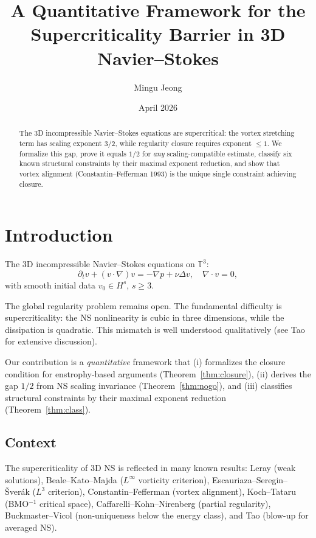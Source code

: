 \documentclass[12pt]{article}
\title{A Quantitative Framework for the\\
Supercriticality Barrier in 3D Navier--Stokes}
\author{Mingu Jeong}
\date{April 2026}
\begin{document}
\maketitle

\begin{abstract}
The 3D incompressible Navier--Stokes equations are
supercritical: the vortex stretching term has scaling
exponent $3/2$, while regularity closure requires
exponent $\leq 1$. We formalize this gap, prove it
equals $1/2$ for \emph{any} scaling-compatible estimate,
classify six known structural constraints by their
maximal exponent reduction, and show that vortex
alignment (Constantin--Fefferman 1993) is the unique
single constraint achieving closure.
\end{abstract}

\section{Introduction}

The 3D incompressible Navier--Stokes equations on
$\mathbb{T}^3$:
\begin{equation}\label{eq:ns}
\partial_t v + (v \cdot \nabla) v
= -\nabla p + \nu \Delta v, \quad
\nabla \cdot v = 0,
\end{equation}
with smooth initial data $v_0 \in H^s$, $s \geq 3$.

The global regularity problem remains open.
The fundamental difficulty is supercriticality:
the NS nonlinearity is cubic in three dimensions,
while the dissipation is quadratic. This mismatch
is well understood qualitatively
(see Tao \cite{tao2016,tao-blog} for extensive discussion).

Our contribution is a \emph{quantitative} framework
that (i) formalizes the closure condition for
enstrophy-based arguments (Theorem~\ref{thm:closure}),
(ii) derives the gap $1/2$ from NS scaling invariance
(Theorem~\ref{thm:nogo}), and
(iii) classifies structural constraints by their
maximal exponent reduction (Theorem~\ref{thm:class}).

\subsection*{Context}

The supercriticality of 3D NS is reflected in
many known results:
Leray \cite{leray1934} (weak solutions),
Beale--Kato--Majda \cite{bkm1984} ($L^\infty$ vorticity criterion),
Escauriaza--Seregin--\v{S}ver\'ak \cite{ess2003} ($L^3$ criterion),
Constantin--Fefferman \cite{cf1993} (vortex alignment),
Koch--Tataru \cite{koch-tataru} (BMO$^{-1}$ critical space),
Caffarelli--Kohn--Nirenberg \cite{ckn} (partial regularity),
Buckmaster--Vicol \cite{buckmaster-vicol} (non-uniqueness below
the energy class),
and Tao \cite{tao2016} (blow-up for averaged NS).
\end{document}
